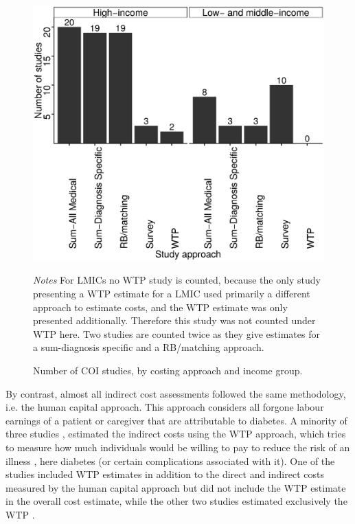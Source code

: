 \begin{figure}[hp]
\caption{\label{fig:review_COI_number}Number of \acs*{COI} studies, by costing approach and income group.}%

\begin{minipage}{\linewidth}
\begin{center}
\includegraphics[width=0.8\linewidth]{Review/Figures/Fig2.eps}\\
\end{center}
\footnotesize
\textit{Notes} For \acp{LMIC} no \ac{WTP} study is counted, because the only study \parencite{Tharkar2010a} presenting a \ac{WTP} estimate for a \ac{LMIC} used primarily a different approach to estimate costs, and the \ac{WTP} estimate was only presented additionally. Therefore this study was not counted under \ac{WTP} here. Two studies are counted twice as they give estimates for a sum-diagnosis specific and a RB/matching approach.
\end{minipage}
\end{figure}

By contrast, almost all indirect cost assessments followed the same methodology, i.e. the human capital approach. This approach considers all forgone labour earnings of a patient or caregiver that are attributable to diabetes. A minority of three studies \parencite{Tharkar2010a,Chang2010b,Gyldmark2001}, estimated the indirect costs using the \ac{WTP} approach, which tries to measure how much individuals would be willing to pay to reduce the risk of an illness \parencite{Segel2006}, here diabetes (or certain complications associated with it). One of the studies included \ac{WTP} estimates in addition to the direct and indirect costs measured by the human capital approach \parencite{Tharkar2010a} but did not include the \ac{WTP} estimate in the overall cost estimate, while the other two studies estimated exclusively the \ac{WTP} \parencite{Chang2010b,Gyldmark2001}.

